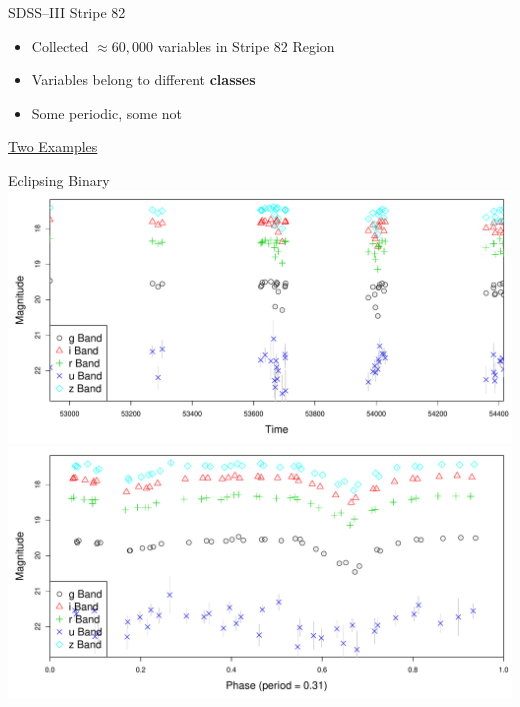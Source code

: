\documentclass[12pt]{beamer}
\begin{document}
\begin{frame}{SDSS--III Stripe 82 \cite{ivezic2007sloan}}
\begin{itemize}
\item Collected $\approx 60,000$ variables in Stripe 82 Region
\item Variables belong to different \textbf{classes}
\item Some periodic, some not
\end{itemize}


\underline{Two Examples}

\vspace{-.2in}

\begin{center}
Eclipsing Binary\\
\includegraphics[scale=.15]{figs/unfolded_4183016.pdf}
\includegraphics[scale=.15]{figs/folded_4183016.pdf}
\end{center}

\vspace{-.2in}




\end{frame}
\end{document}
